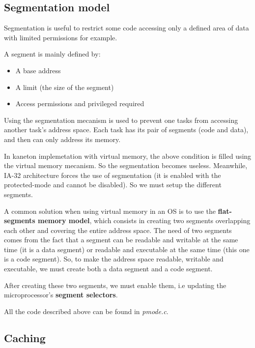 %
%

\subsection{Segmentation model}

Segmentation is useful to restrict some code accessing only a defined
area of data with limited permissions for example.

A segment is mainly defined by:

\begin{itemize}
  \item A base address
  \item A limit (the size of the segment)
  \item Access permissions and privileged required
\end{itemize}

Using the segmentation mecanism is used to prevent one tasks from
accessing another task's address space. Each task has its pair of
segments (code and data), and then can only address its memory.

In kaneton implemetation with virtual memory, the above condition is
filled using the virtual memory mecanism. So the segmentation becomes
useless. Meanwhile, IA-32 architecture forces the use of segmentation
(it is enabled with the protected-mode and cannot be disabled). So we
must setup the different segments.

A common solution when using virtual memory in an OS is to use the
\textbf{flat-segments memory model}, which consists in creating two
segments overlapping each other and covering the entire address
space. The need of two segments comes from the fact that a segment can
be readable and writable at the same time (it is a data segment) or
readable and executable at the same time (this one is a code
segment). So, to make the address space readable, writable and
executable, we must create both a data segment and a code segment.

After creating these two segments, we must enable them, i.e updating
the microprocessor's \textbf{segment selectors}.

All the code described above can be found in \textit{pmode.c}.

%
%

\subsection{Caching}

